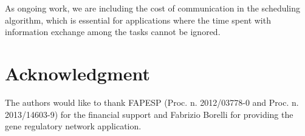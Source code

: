 \documentclass[journal]{IEEEtran}
\begin{document}
As ongoing work, we are including the cost of communication in the scheduling
algorithm, which is essential for applications where the time spent with
information exchange among the tasks cannot be ignored.

\section*{Acknowledgment}

The authors would like to thank FAPESP (Proc. n. 2012/03778-0 and Proc. n.
2013/14603-9) for the financial support and Fabrizio Borelli for providing the
gene regulatory network application.

\ifCLASSOPTIONcaptionsoff
  \newpage
\fi


%
%

\end{document}
